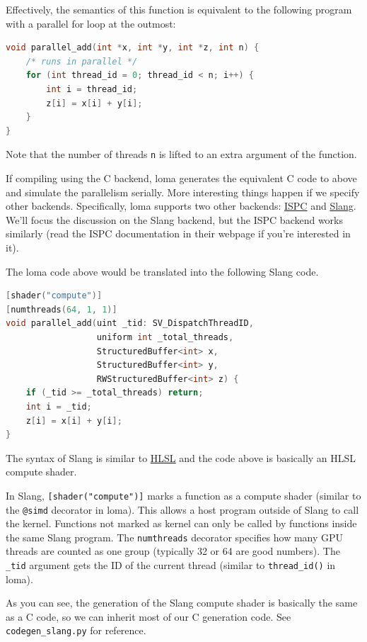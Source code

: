 Effectively, the semantics of this function is equivalent to the following program with a parallel for loop at the outmost:
\begin{lstlisting}[language=c]
void parallel_add(int *x, int *y, int *z, int n) {
    /* runs in parallel */
    for (int thread_id = 0; thread_id < n; i++) {
        int i = thread_id;
        z[i] = x[i] + y[i];
    }
}
\end{lstlisting}
Note that the number of threads \lstinline{n} is lifted to an extra argument of the function.

If compiling using the C backend, loma generates the equivalent C code to above and simulate the parallelism serially. More interesting things happen if we specify other backends. Specifically, loma supports two other backends: \href{https://ispc.github.io/}{ISPC} and \href{https://shader-slang.org/}{Slang}. We'll focus the discussion on the Slang backend, but the ISPC backend works similarly (read the ISPC documentation in their webpage if you're interested in it).

The loma code above would be translated into the following Slang code.
\begin{lstlisting}[language=c]
[shader("compute")]
[numthreads(64, 1, 1)]
void parallel_add(uint _tid: SV_DispatchThreadID,
                  uniform int _total_threads,
                  StructuredBuffer<int> x,
                  StructuredBuffer<int> y,
                  RWStructuredBuffer<int> z) {
    if (_tid >= _total_threads) return;
    int i = _tid;
    z[i] = x[i] + y[i];
}
\end{lstlisting}

The syntax of Slang is similar to \href{https://learn.microsoft.com/en-us/windows/win32/direct3dhlsl/dx-graphics-hlsl}{HLSL} and the code above is basically an HLSL compute shader.

In Slang, \lstinline{[shader("compute")]} marks a function as a compute shader (similar to the \lstinline{@simd} decorator in loma). This allows a host program outside of Slang to call the kernel. Functions not marked as kernel can only be called by functions inside the same Slang program. The \lstinline{numthreads} decorator specifies how many GPU threads are counted as one group (typically 32 or 64 are good numbers). The \lstinline{_tid} argument gets the ID of the current thread (similar to \lstinline{thread_id()} in loma). 

As you can see, the generation of the Slang compute shader is basically the same as a C code, so we can inherit most of our C generation code. See \lstinline{codegen_slang.py} for reference.

